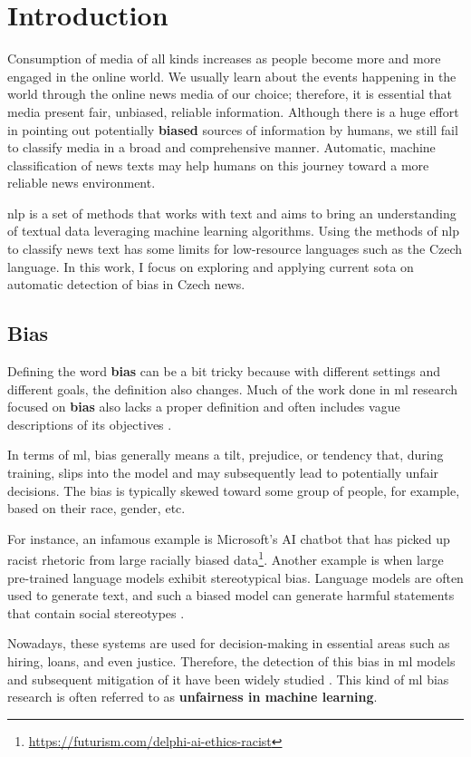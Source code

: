 \chapter{Introduction}
Consumption of media of all kinds increases as people become more and more engaged in the online world. We usually learn about the events happening in the world through the online news media of our choice; therefore, it is essential that media present fair, unbiased, reliable information. Although there is a huge effort in pointing out potentially \textbf{biased} sources of information by humans, we still fail to classify media in a broad and comprehensive manner. Automatic, machine classification of news texts may help humans on this journey toward a more reliable news environment.

\gls{nlp} is a set of methods that works with text and aims to bring an understanding of textual data leveraging machine learning algorithms. Using the methods of \gls{nlp} to classify news text has some limits for low-resource languages such as the Czech language. In this work, I focus on exploring and applying current \gls{sota} on automatic detection of bias in Czech news.


\section{Bias}
Defining the word \textbf{bias} can be a bit tricky because with different settings and different goals, the definition also changes. Much of the work done in \gls{ml} research focused on \textbf{bias} also lacks a proper definition and often includes vague descriptions of its objectives \cite{blodgett2020language}. 

In terms of \Gls{ml}, bias generally means a tilt, prejudice, or tendency that, during training, slips into the model and may subsequently lead to potentially unfair decisions. The bias is typically skewed toward some group of people, for example, based on their race, gender, etc. 

For instance, an infamous example is Microsoft's AI chatbot that has picked up racist rhetoric from large racially biased data\footnote{\url{https://futurism.com/delphi-ai-ethics-racist}}. Another example is when large pre-trained language models exhibit stereotypical bias. Language models are often used to generate text, and such a biased model can generate harmful statements that contain social stereotypes \cite{nadeem2021stereoset}.

Nowadays, these systems are used for decision-making in essential areas such as hiring, loans, and even justice. Therefore, the detection of this bias in \Gls{ml} models and subsequent mitigation of it have been widely studied \cite{blodgett2020language}. This kind of \gls{ml} bias research is often referred to as \textbf{unfairness in machine learning}.

